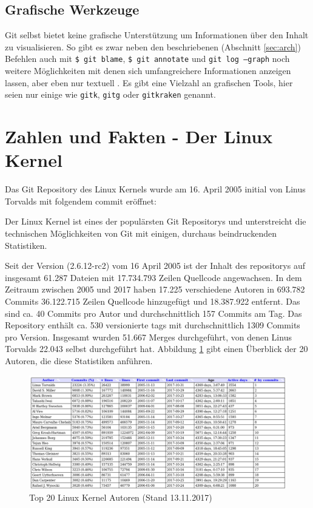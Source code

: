 \subsection{Grafische Werkzeuge}
Git selbst bietet keine grafische Unterstützung um Informationen über den
Inhalt zu visualisieren. So gibt es zwar neben den beschriebenen (Abschnitt
\ref{sec:arch}) Befehlen auch mit \texttt{\$ git blame}, \texttt{\$ git annotate} und
\texttt{git log --graph} noch weitere Möglichkeiten mit denen sich
umfangreichere Informationen anzeigen lassen, aber eben nur
textuell \cite[S.~302]{gitwf}. Es gibt eine Vielzahl an grafischen Tools, hier
seien nur einige wie \texttt{gitk}, \texttt{gitg} oder \texttt{gitkraken}
genannt.

\section{Zahlen und Fakten - Der Linux Kernel}\label{sec:kernel}
Das Git Repository des Linux Kernels wurde am 16. April 2005 initial von Linus
Torvalds mit folgendem \gls{commit} \cite{link:linuxgit} eröffnet:



Der Linux Kernel ist eines der populärsten Git Repositorys und unterstreicht
die technischen Möglichkeiten von Git mit einigen, durchaus beindruckenden
Statistiken.

Seit der Version (2.6.12-rc2) vom 16 April 2005 ist der Inhalt des
\glspl{repository} auf insgesamt 61.287 Dateien mit 17.734.793 Zeilen Quellcode
angewachsen. In dem Zeitraum zwischen 2005 und 2017 haben 17.225 verschiedene
Autoren in 693.782 Commits 36.122.715 Zeilen Quellcode hinzugefügt und
18.387.922 entfernt. Das sind ca. 40 Commits pro Autor und durchschnittlich
157 Commits am Tag. Das Repository enthält ca. 530 versionierte \glspl{tag}
mit durchschnittlich 1309 Commits pro Version. Insgesamt wurden
51.667 Merges durchgeführt, von denen Linus Torvalds 22.043 selbst durchgeführt
hat. Abbildung \ref{top20} gibt einen Überblick der 20 Autoren, die diese
Statistiken anführen.

\begin{figure}
	\centering
  \includegraphics[scale=0.40]{images/top_20_of_linux_authors.png}
	\caption{Top 20 Linux Kernel Autoren (Stand 13.11.2017)}
	\label{top20}
\end{figure}

